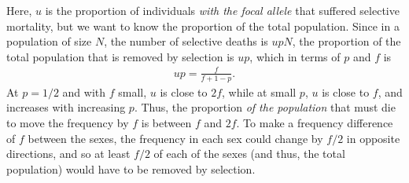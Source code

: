 \documentclass{article}
\begin{document}
Here, $u$ is the proportion of individuals \emph{with the focal allele} that suffered selective mortality, but we want to know the proportion of the total population.
Since in a population of size $N$, the number of selective deaths is $u p N$,
the proportion of the total population that is removed by selection is $u p$,
which in terms of $p$ and $f$ is
\begin{align*}
    u p = \frac{f}{f + 1 - p} .
\end{align*}
At $p = 1/2$ and with $f$ small, $u$ is close to $2 f$,
while at small $p$, $u$ is close to $f$,
and increases with increasing $p$.
Thus, the proportion \emph{of the population} that must die to move the frequency by $f$
is between $f$ and $2 f$.
To make a frequency difference of $f$ between the sexes,
the frequency in each sex could change by $f/2$ in opposite directions,
and so at least $f/2$ of each of the sexes (and thus, the total population)
would have to be removed by selection.




\end{document}

